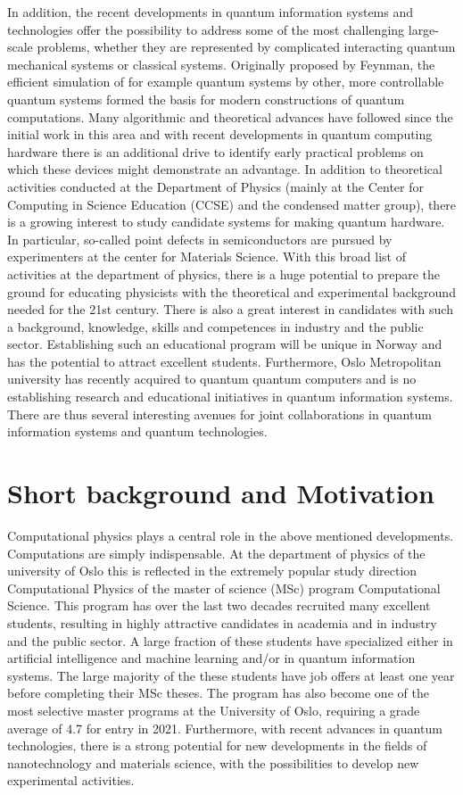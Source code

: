 \documentclass[aps,rmp,preprint,amsmath,amssymb,graphicx,longbibliography]{revtex4-1}
\begin{document}
In addition, the recent developments in quantum information systems
and technologies offer the possibility to address some of the most
challenging large-scale problems, whether they are represented by
complicated interacting quantum mechanical systems or classical
systems.  Originally proposed by Feynman, the efficient simulation of
for example quantum systems by other, more controllable quantum
systems formed the basis for modern constructions of quantum
computations.  Many algorithmic and theoretical advances have followed
since the initial work in this area and with recent developments in
quantum computing hardware there is an additional drive to identify
early practical problems on which these devices might demonstrate an
advantage. In addition to theoretical activities conducted at the
Department of Physics (mainly at the Center for Computing in Science
Education (CCSE) and the condensed matter group), there is a growing
interest to study candidate systems for making quantum hardware. In
particular, so-called point defects in semiconductors are pursued by
experimenters at the center for Materials Science.  With this broad
list of activities at the department of physics, there is a huge
potential to prepare the ground for educating physicists with the
theoretical and experimental background needed for the 21st
century. There is also a great interest in candidates with such a
background, knowledge, skills and competences in industry and the
public sector.  Establishing such an educational program will be
unique in Norway and has the potential to attract excellent students.
Furthermore, Oslo Metropolitan university  has recently acquired to quantum quantum computers and is no establishing research and educational initiatives in quantum information systems. There are thus several interesting avenues for joint collaborations in quantum information systems and quantum technologies.


\section{Short background and Motivation}

Computational physics plays a central role in the above mentioned
developments.  Computations are simply indispensable.  At the
department of physics of the university of Oslo this is reflected in
the extremely popular study direction Computational Physics of the
master of science (MSc) program Computational Science. This program
has over the last two decades recruited many excellent students,
resulting in highly attractive candidates in academia and in industry
and the public sector. A large fraction of these students have
specialized either in artificial intelligence and machine learning
and/or in quantum information systems.  The large majority of the
these students have job offers at least one year before completing
their MSc theses. The program has also become one of the most
selective master programs at the University of Oslo, requiring a grade
average of 4.7 for entry in 2021. Furthermore, with recent advances in
quantum technologies, there is a strong potential for new developments
in the fields of nanotechnology and materials science, with the
possibilities to develop new experimental activities.
\end{document}
